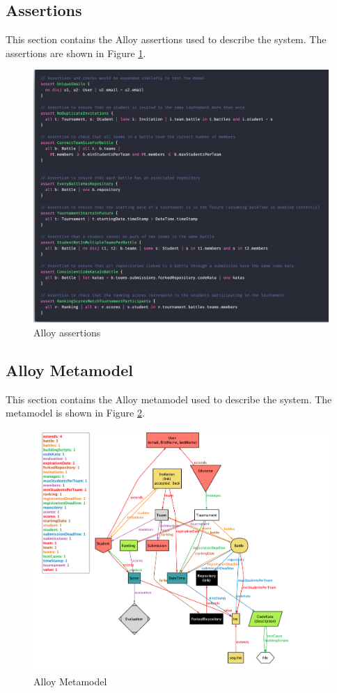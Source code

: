 \subsection{Assertions}
This section contains the Alloy assertions used to describe the system. The assertions are shown in Figure \ref{fig:alloy_assertions}.
\begin{figure}[H]
    \centering
    \includegraphics[width=1\textwidth]{Images/alloy_assertions.png}
    \caption{Alloy assertions}
    \label{fig:alloy_assertions}
\end{figure}

\newpage
\subsection{Alloy Metamodel}
This section contains the Alloy metamodel used to describe the system. The metamodel is shown in Figure \ref{fig:alloy_metamodel}.
\begin{figure}[H]
    \centering
    \includegraphics[width=1\textwidth]{Images/metamodel.png}
    \caption{Alloy Metamodel}
    \label{fig:alloy_metamodel}
\end{figure}